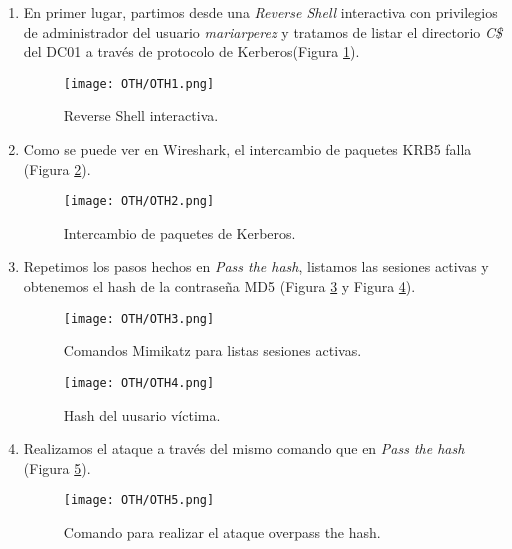 \begin{enumerate}
\item En primer lugar, partimos desde una {\it Reverse Shell} interactiva con privilegios de administrador del usuario {\it mariarperez} y tratamos de listar el directorio {\it C\$} del DC01 a través de protocolo de Kerberos(Figura \ref{OTH1}).
\begin{figure}[H] %
\begin{center}
\texttt{[image: OTH/OTH1.png]}
\end{center}
\caption{Reverse Shell interactiva.}
\label{OTH1}
\end{figure}

\item Como se puede ver en Wireshark, el intercambio de paquetes KRB5 falla (Figura \ref{OTH2}).
\begin{figure}[H] %
\begin{center}
\texttt{[image: OTH/OTH2.png]}
\end{center}
\caption{Intercambio de paquetes de Kerberos.}
\label{OTH2}
\end{figure}

\item Repetimos los pasos hechos en {\it Pass the hash}, listamos las sesiones activas y obtenemos el hash de la contraseña MD5 (Figura \ref{OTH3} y Figura \ref{OTH4}).
\begin{figure}[H] %
\begin{center}
\texttt{[image: OTH/OTH3.png]}
\end{center}
\caption{Comandos Mimikatz para listas sesiones activas.}
\label{OTH3}
\end{figure}

\begin{figure}[H] %
\begin{center}
\texttt{[image: OTH/OTH4.png]}
\end{center}
\caption{Hash del uusario víctima.}
\label{OTH4}
\end{figure}

\item Realizamos el ataque a través del mismo comando que en {\it Pass the hash} (Figura \ref{OTH5}).
\begin{figure}[H] %
\begin{center}
\texttt{[image: OTH/OTH5.png]}
\end{center}
\caption{Comando para realizar el ataque overpass the hash.}
\label{OTH5}
\end{figure}


\end{enumerate}
